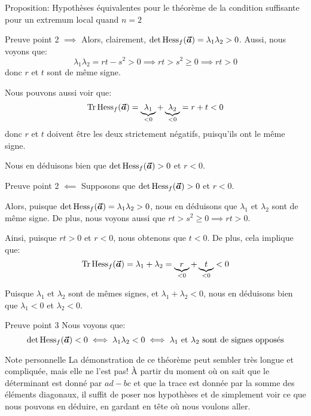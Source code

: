\documentclass[a4paper]{article}
\begin{document}
\begin{parag}{Proposition: Hypothèses équivalentes pour le théorème de la condition suffisante pour un extremum local quand $n = 2$}
\begin{subparag}{Preuve point 2 $\implies$}
         Alors, clairement, $\det\Hess_f\left(\bvec{a}\right) = \lambda_1 \lambda_2 > 0$. Aussi, nous voyons que: 
         \[\lambda_1 \lambda_2 = rt - s^2 > 0 \implies rt > s^2 \geq 0 \implies rt > 0\]
         donc $r$ et $t$ sont de même signe.

         Nous pouvons aussi voir que: 
         \[\Tr\Hess_f\left(\bvec{a}\right) = \underbrace{\lambda_1}_{< 0} + \underbrace{\lambda_2}_{< 0} = r + t < 0\]
         donc $r$ et $t$ doivent être les deux strictement négatifs, puisqu'ils ont le même signe.

         Nous en déduisons bien que $\det\Hess_f\left(\bvec{a}\right) > 0$ et $r < 0$.
    \end{subparag}
    
    \begin{subparag}{Preuve point 2 $\impliedby$}
        Supposons que $\det\Hess_f\left(\bvec{a}\right) > 0$ et $r < 0$.

        Alors, puisque $\det\Hess_f\left(\bvec{a}\right) = \lambda_1 \lambda_2 > 0$, nous en déduisons que $\lambda_1$ et $\lambda_2$ sont de même signe. De plus, nous voyons aussi que $rt > s^2 \geq 0 \implies rt > 0$.

        Ainsi, puisque $rt > 0$ et $r < 0$, nous obtenons que $t < 0$. De plus, cela implique que: 
        \[\Tr\Hess_f\left(\bvec{a}\right) = \lambda_1 + \lambda_2 = \underbrace{r}_{< 0} + \underbrace{t}_{< 0} < 0\]
        
        Puisque $\lambda_1$ et $\lambda_2$ sont de mêmes signes, et $\lambda_1 + \lambda_2 < 0$, nous en déduisons bien que $\lambda_1 < 0$ et $\lambda_2 < 0$.
    \end{subparag}

    \begin{subparag}{Preuve point 3}
        Nous voyons que: 
        \[\det\Hess_f\left(\bvec{a}\right) < 0 \iff \lambda_1 \lambda_2 < 0 \iff \lambda_1 \text{ et } \lambda_2 \text{ sont de signes opposés}\]
        
    \end{subparag}

    \begin{subparag}{Note personnelle}
        La démonstration de ce théorème peut sembler très longue et compliquée, mais elle ne l'est pas! À partir du moment où on sait que le déterminant est donné par $ad - bc$ et que la trace est donnée par la somme des éléments diagonaux, il suffit de poser nos hypothèses et de simplement voir ce que nous pouvons en déduire, en gardant en tête où nous voulons aller.
    \end{subparag}
\end{parag}
\end{document}
